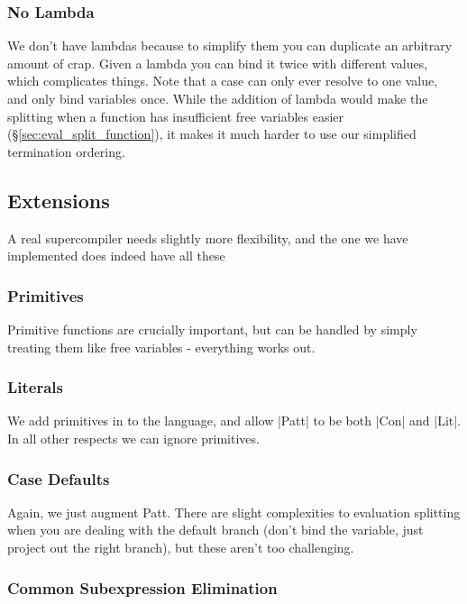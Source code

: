 \documentclass[draft]{sigplanconf}
\begin{document}
\subsubsection{No Lambda}
\label{sec:nolambda}

We don't have lambdas because to simplify them you can duplicate an arbitrary amount of crap. Given a lambda you can bind it twice with different values, which complicates things. Note that a case can only ever resolve to one value, and only bind variables once. While the addition of lambda would make the splitting when a function has insufficient free variables easier (\S\ref{sec:eval_split_function}), it makes it much harder to use our simplified termination ordering.

\subsection{Extensions}
\label{sec:extensions}

A real supercompiler needs slightly more flexibility, and the one we have implemented does indeed have all these

\subsubsection{Primitives}

Primitive functions are crucially important, but can be handled by simply treating them like free variables - everything works out.

\subsubsection{Literals}

We add primitives in to the language, and allow |Patt| to be both |Con| and |Lit|. In all other respects we can ignore primitives.

\subsubsection{Case Defaults}

Again, we just augment Patt. There are slight complexities to evaluation splitting when you are dealing with the default branch (don't bind the variable, just project out the right branch), but these aren't too challenging.

\subsubsection{Common Subexpression Elimination}
\end{document}
